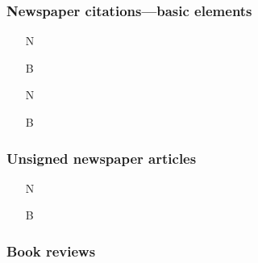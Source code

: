 \documentclass[11pt,letterpaper,oneside]{article}
\begin{document}

\setcounter{subsubsection}{202}
\subsubsection{Newspaper citations---basic elements}

\begin{itemize}
\item[N] 

\item[B] 

\item[N] 

\item[B] 
\end{itemize}


\setcounter{subsubsection}{206}
\subsubsection{Unsigned newspaper articles}

\begin{itemize}
\item[N] 

\item[B] 
\end{itemize}



\setcounter{subsubsection}{214}
\subsubsection{Book reviews}
\label{14.215}
\end{document}
